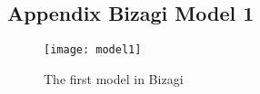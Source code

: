 \begin{landscape}
	\section{Appendix Bizagi Model 1}
	\label{app:appendix_model1}
	\begin{figure}[H]
		\texttt{[image: model1]}
		\caption{The first model in Bizagi}
		\label{fig:model1}
	\end{figure}
\end{landscape}

\clearpage
